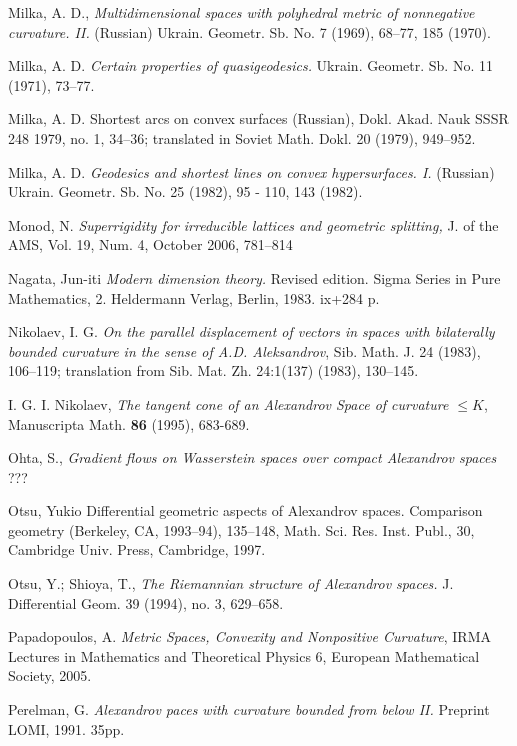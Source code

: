 \begin{thebibliography}{52}
Milka, A. D., \textit{Multidimensional spaces with polyhedral metric of nonnegative curvature. II.}  (Russian)  Ukrain. Geometr. Sb. No. 7
(1969), 68--77, 185 (1970).

Milka, A. D. \textit{Certain properties of quasigeodesics.} 
Ukrain. Geometr. Sb. No. 11 (1971), 73--77.

 {Milka, A. D.} {Shortest arcs on convex surfaces} (Russian),  {Dokl. Akad.
Nauk SSSR}  {248}  {1979}, {no. 1}, {34--36};  translated in  Soviet Math. Dokl. 20 (1979), 949--952.

 Milka, A. D.  \textit{Geodesics and shortest lines on convex hypersurfaces.  I.}  (Russian)   Ukrain. Geometr. Sb. No. 25
(1982), 95 - 110, 143 (1982).

 Monod, N. \textit{Superrigidity for irreducible lattices and geometric splitting,} J. of the AMS,
Vol. 19, Num. 4, October 2006, 781--814

 Nagata, Jun-iti \textit{Modern dimension theory.} Revised edition. Sigma Series in Pure Mathematics, 2. Heldermann Verlag, Berlin, 1983. ix+284 p.

 Nikolaev, I. G. \textit{On the parallel displacement of vectors in spaces with
bilaterally bounded curvature in the sense of A.D. Aleksandrov}, Sib. Math.
J. 24 (1983), 106--119; translation from Sib. Mat. Zh. 24:1(137) (1983), 130--145.

 I. G. I. Nikolaev, {\em The tangent cone of an Alexandrov Space of curvature $\le K$}, Manuscripta Math. {\bf 86} (1995), 683-689.

 Ohta, S., \textit{Gradient flows on Wasserstein spaces
over compact Alexandrov spaces} ???

 Otsu, Yukio Differential geometric aspects of Alexandrov spaces.  Comparison
geometry (Berkeley, CA, 1993--94),  135--148, Math. Sci. Res. Inst. Publ., 30,
Cambridge Univ. Press, Cambridge, 1997.

 Otsu, Y.; Shioya, T., \textit{The Riemannian structure of Alexandrov spaces.}  J. Differential Geom.  39  (1994),  no. 3, 629--658.

  Papadopoulos, A.
\textit{Metric Spaces, Convexity and Nonpositive Curvature},
IRMA Lectures in Mathematics and Theoretical Physics 6, European Mathematical Society, 2005. 


 Perelman, G. \textit{Alexandrov paces with curvature
bounded from below II.} Preprint LOMI, 1991. 35pp.


\end{thebibliography}

